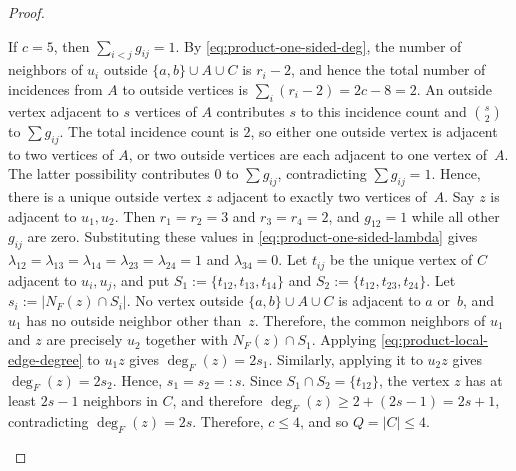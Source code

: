 \documentclass[a4paper]{article}
\theoremstyle{plain}
\theoremstyle{definition}
\numberwithin{equation}{section}
\begin{document}
\begin{proof}
\begin{itemize}
If $c=5$, then $\displaystyle \sum_{i<j}g_{ij}=1$.
By \eqref{eq:product-one-sided-deg}, the number of neighbors of $u_i$ outside $\{a,b\}\cup A\cup C$ is $r_i-2$, and hence the total number of incidences from $A$ to outside vertices is $\displaystyle \sum_i(r_i-2)=2c-8=2$.
An outside vertex adjacent to $s$ vertices of $A$ contributes $s$ to this incidence count and $\displaystyle \binom{s}{2}$ to $\displaystyle \sum g_{ij}$.
The total incidence count is $2$, so either one outside vertex is adjacent to two vertices of $A$, or two outside vertices are each adjacent to one vertex of~$A$.
The latter possibility contributes $0$ to $\displaystyle \sum g_{ij}$, contradicting $\displaystyle \sum g_{ij}=1$.
Hence, there is a unique outside vertex $z$ adjacent to exactly two vertices of~$A$.
Say $z$ is adjacent to $u_1,u_2$.
Then $r_1=r_2=3$ and $r_3=r_4=2$,
and $g_{12}=1$ while all other $g_{ij}$ are zero.
Substituting these values in \eqref{eq:product-one-sided-lambda} gives $\lambda_{12}=\lambda_{13}=\lambda_{14}=\lambda_{23}=\lambda_{24}=1$ and $\lambda_{34}=0$.
Let $t_{ij}$ be the unique vertex of $C$ adjacent to $u_i,u_j$, and put $S_1:=\{t_{12},t_{13},t_{14}\}$ and $S_2:=\{t_{12},t_{23},t_{24}\}$.
Let $s_i:=|N_F(z)\cap S_i|$.
No vertex outside $\{a,b\}\cup A\cup C$ is adjacent to $a$ or~$b$, and $u_1$ has no outside neighbor other than~$z$.
Therefore, the common neighbors of $u_1$ and $z$ are precisely $u_2$ together with $N_F(z)\cap S_1$.
Applying \eqref{eq:product-local-edge-degree} to $u_1z$ gives $\deg_F(z)=2s_1$.
Similarly, applying it to $u_2z$ gives $\deg_F(z)=2s_2$.
Hence, $s_1=s_2=:s$.
Since $S_1\cap S_2=\{t_{12}\}$, the vertex $z$ has at least $2s-1$ neighbors in $C$, and therefore $\deg_F(z)\ge 2+(2s-1)=2s+1$,
contradicting $\deg_F(z)=2s$.
Therefore, $c\le 4$, and so $Q=|C|\le 4$.


\end{itemize}
\end{proof}
\end{document}
